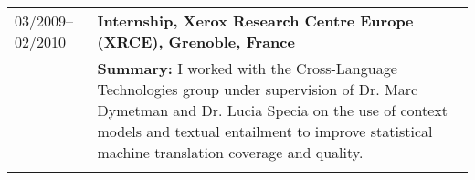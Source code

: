 \begin{tabular}{p{2.92cm}  p{13cm}}
03/2009--02/2010	& \bf Internship, Xerox Research Centre Europe (XRCE), Grenoble, France \\
	& {\bf Summary:} I worked with the Cross-Language Technologies group under supervision of Dr. Marc Dymetman and Dr. Lucia Specia on the use of context models and textual entailment to improve statistical machine translation coverage and quality. \\ %
	& \\
\end{tabular}
